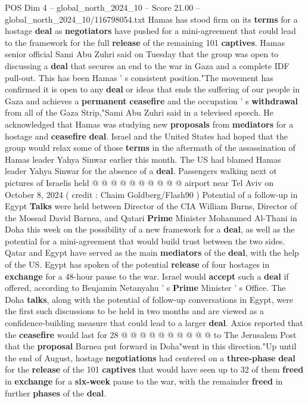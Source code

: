 \begin{textsample}{POS Dim 4 – global\_north\_2024\_10 – Score 21.00 – global\_north\_2024\_10/116798054.txt}  \label{ex:f4_pos_402}
Hamas has stood firm on its \textbf{terms} for a hostage \textbf{deal} as \textbf{negotiators} have pushed for a mini-agreement that could lead to the framework for the full \textbf{release} of the remaining 101 \textbf{captives}.
Hamas senior official Sami Abu Zuhri said on Tuesday that the group was open to discussing a \textbf{deal} that secures an end to the war in Gaza and a complete IDF pull-out.
This has been Hamas ' s consistent position."The movement has confirmed it is open to any \textbf{deal} or ideas that ends the suffering of our people in Gaza and achieves a \textbf{permanent} \textbf{ceasefire} and the occupation ' s \textbf{withdrawal} from all of the Gaza Strip,"Sami Abu Zuhri said in a televised speech.
He acknowledged that Hamas was studying new \textbf{proposals} from \textbf{mediators} for a hostage and \textbf{ceasefire} \textbf{deal}.
Israel and the United States had hoped that the group would relax some of those \textbf{terms} in the aftermath of the assassination of Hamas leader Yahya Sinwar earlier this month.
The US had blamed Hamas leader Yahya Sinwar for the absence of a \textbf{deal}.
Passengers walking next ot pictures of Israelis held @ @ @ @ @ @ @ @ @ @ airport near Tel Aviv on October 8, 2024 ( credit : Chaim Goldberg/Flash90 ) Potential of a follow-up in Egypt \textbf{Talks} were held between Director of the CIA William Burns, Director of the Mossad David Barnea, and Qatari \textbf{Prime} Minister Mohammed Al-Thani in Doha this week on the possibility of a new framework for a \textbf{deal}, as well as the potential for a mini-agreement that would build trust between the two sides.
Qatar and Egypt have served as the main \textbf{mediators} of the \textbf{deal}, with the help of the US.
Egypt has spoken of the potential \textbf{release} of four hostages in \textbf{exchange} for a 48-hour pause to the war.
Israel would \textbf{accept} such a \textbf{deal} if offered, according to Benjamin Netanyahu ' s \textbf{Prime} Minister ' s Office.
The Doha \textbf{talks}, along with the potential of follow-up conversations in Egypt, were the first such discussions to be held in two months and are viewed as a confidence-building measure that could lead to a larger \textbf{deal}.
Axios reported that the \textbf{ceasefire} would last for 28 @ @ @ @ @ @ @ @ @ @ to The Jerusalem Post that the \textbf{proposal} Barnea put forward in Doha"went in this direction."Up until the end of August, hostage \textbf{negotiations} had centered on a \textbf{three-phase} \textbf{deal} for the \textbf{release} of the 101 \textbf{captives} that would have seen up to 32 of them \textbf{freed} in \textbf{exchange} for a \textbf{six-week} pause to the war, with the remainder \textbf{freed} in further \textbf{phases} of the \textbf{deal}.

\end{textsample}
